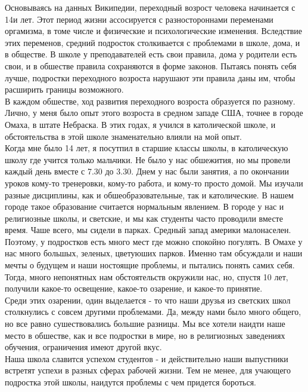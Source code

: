\documentclass[12pt,a4paper]{article}
\begin{document}
Основываясь на данных Википедии, переходный возрост человека начинается с 14и лет.
Этот период жизни ассосируется с разностороннами переменами оргамизма, в томе числе
и физические и психологические изменения. Вследствие этих переменов, средний подросток
столкивается с проблемами в школе, дома, и в обществе. В школе у преподавателей есть свои правила,
дома у родители есть свои, и в обшестве правила сохраняются в форме законов. Пытаясь понять себя
лучше, подростки переходного возроста нарушают эти правила даны им, чтобы расширить границы возможного.\\

В каждом обшестве, ход развития переходного возроста образуется по разному. Лично, у меня было
опыт этого возроста в средном западе США, точнее в городе Омаха, в штате Небраска. В этих годах,
я учился в католической школе, и обстоятельства в этой школе знаменательно влияли на мой опыт. \\

Когда мне было 14 лет, я посутпил в старшие классы школы, в католическую школу где учится только мальчики.
Не было у нас обшежития, но мы провели каждый день вместе с 7.30 до 3.30. Днем у нас были занятия,
а по окончании уроков кому-то тренеровки, кому-то работа, и кому-то просто домой.
Мы изучали разные дисциплины, как и обшеобразовательные, так и католические. В нашем городе такое образование
считается нормальным явлением. В городе у нас и религиозные школы, и светские, и мы как студенты часто проводили вместе время.
Чаше всего, мы сидели в парках. Средный запад америки малонаселен. Поэтому, у подростков есть много мест
где можно спокойно погулять. В Омахе у нас много большых, зеленых, цветуюших парков. Именно там обсуждали
и наши мечты о будущем и наши ностоящие проблемы, и пытались понять самих себя.\\

Тогда, много непонятных нам обстоятельств окружили нас, но, спустя 10 лет, получили какое-то освещение, какое-то
озарение, и какое-то принятие.\\

Среди этих озарении, один выделается - то что наши друзья из светских школ столкнулись с совсем другими проблемами. Да,
между нами было много общего, но все равно сушествовались большие разницы. Мы все хотели наидти наше место в
обшестве, как и все подростки в мире, но в религиозных заведениях обучения, ограничения имеют другой вкус.\\

Наша школа славится успехом студентов - и действительно наши выпустники встретят успехи в разных сферах рабочей жизни.
Тем не менее, для учающего подростка этой школы, наидутся проблемы с чем придется бороться.\\
\end{document}
